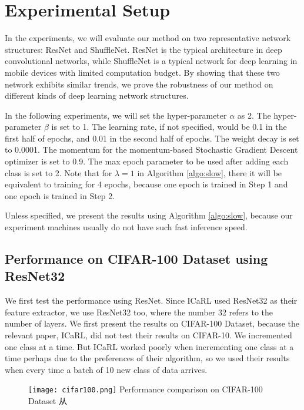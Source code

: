 \section{Experimental Setup}

In the experiments, we will evaluate our method on two representative network structures: ResNet and ShuffleNet. ResNet is the typical architecture in deep convolutional networks, while ShuffleNet is a typical network for deep learning in mobile devices with limited computation budget. By showing that these two network exhibits similar trends, we prove the robustness of our method on different kinds of deep learning network structures. 

In the following experiments, we will set the hyper-parameter $\alpha$ as 2. The hyper-parameter $\beta$ is set to 1. The learning rate, if not specified, would be 0.1 in the first half of epochs, and 0.01 in the second half of epochs. The weight decay is set to 0.0001. The momentum for the momentum-based Stochastic Gradient Descent optimizer is set to 0.9. The max epoch parameter to be used after adding each class is set to 2. Note that for $\lambda=1$ in Algorithm \ref{algo:slow}, there it will be equivalent to training for 4 epochs, because one epoch is trained in Step 1 and one epoch is trained in Step 2.

Unless specified, we present the results using Algorithm \ref{algo:slow}, because our experiment machines usually do not have such fast inference speed.

\subsection{Performance on CIFAR-100 Dataset using ResNet32}

We first test the performance using ResNet. Since ICaRL used ResNet32 as their feature extractor, we use ResNet32 too, where the number 32 refers to the number of layers. We first present the results on CIFAR-100 Dataset, because the relevant paper, ICaRL, did not test their results on CIFAR-10. We incremented one class at a time. But ICaRL worked poorly when incrementing one class at a time perhaps due to the preferences of their algorithm, so we used their results when every time a batch of 10 new class of data arrives. 

\begin{figure}[!htp]
	\centering
	\texttt{[image: cifar100.png]}
	{Performance comparison on CIFAR-100 Dataset}
	\label{fig:cifar100}从
\end{figure}


